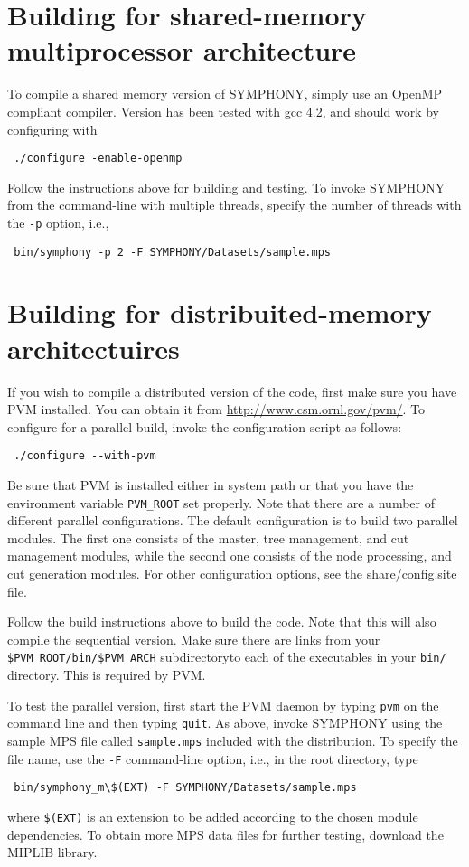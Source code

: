 \section{Building for shared-memory multiprocessor architecture}

To compile a shared memory version of SYMPHONY, simply use an OpenMP compliant
compiler. Version \VER has been tested with gcc 4.2, and should work by
configuring with
{\color{Brown}
\begin{verbatim}
 ./configure -enable-openmp
\end{verbatim}
}
Follow the instructions above for building and testing. To invoke SYMPHONY
from the command-line with multiple threads, specify the number of threads
with the \texttt{-p} option, i.e.,
{\color{Brown}
\begin{verbatim}
 bin/symphony -p 2 -F SYMPHONY/Datasets/sample.mps
\end{verbatim}
}
\section{Building for distribuited-memory architectuires}

If you wish to compile a distributed version of the code, first make sure
you have PVM installed. You can obtain it from
\url{http://www.csm.ornl.gov/pvm/}. To configure for a parallel build, invoke
the configuration script as follows:
{\color{Brown}
\begin{verbatim}
 ./configure --with-pvm
\end{verbatim}
}
Be sure that PVM is installed either in system path or that you have the
environment variable \texttt{PVM\_ROOT} set properly. Note that there are a
number of different parallel configurations. The default configuration is to
build two parallel modules. The first one consists of the master, tree
management, and cut management modules, while the second one consists of the
node processing, and cut generation modules. For other configuration options,
see the share/config.site file.

Follow the build instructions above to build the code. Note that this will
also compile the sequential version. Make sure there are links from your
\texttt{\$PVM\_ROOT/bin/\$PVM\_ARCH} subdirectoryto each of the executables in
your \texttt{bin/} directory. This is required by PVM.

To test the parallel version, first start the PVM daemon by typing
\texttt{pvm} on the command line and then typing \texttt{quit}. As above,
invoke SYMPHONY using the sample MPS file called \texttt{sample.mps} included
with the distribution. To specify the file name, use the \texttt{-F}
command-line option, i.e., in the root directory, type
{\color{Brown}
\begin{verbatim}
 bin/symphony_m\$(EXT) -F SYMPHONY/Datasets/sample.mps 
\end{verbatim}
}
where \texttt{\$(EXT)} is an extension to be added according to the chosen
module dependencies. To obtain more MPS data files for further testing,
download the MIPLIB library.

